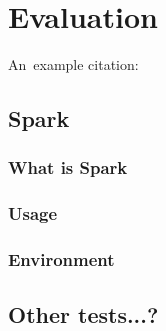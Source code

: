 \chapter{Evaluation}

An~example citation: \cite{Andel07}

\section{Spark}

\subsection{What is Spark}
\subsection{Usage}
\subsection{Environment}

\section{Other tests...?}

